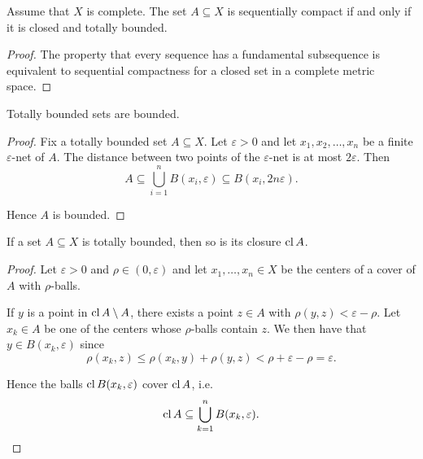 \begin{corollary}\label{thm:metric_space_compact_iff_closed_totally_bounded}
  Assume that \( X \) is complete. The set \( A \subseteq X \) is sequentially compact if and only if it is closed and totally bounded.
\end{corollary}
\begin{proof}
  The property that every sequence has a fundamental subsequence is equivalent to sequential compactness for a closed set in a complete metric space.
\end{proof}

\begin{proposition}\label{thm:totally_bounded_sets_are_bounded}
  Totally bounded sets are bounded.
\end{proposition}
\begin{proof}
  Fix a totally bounded set \( A \subseteq X \). Let \( \varepsilon > 0 \) and let \( x_1, x_2, \ldots, x_n \) be a finite \( \varepsilon \)-net of \( A \). The distance between two points of the \( \varepsilon \)-net is at most \( 2\varepsilon \). Then
  \begin{equation*}
    A \subseteq \bigcup_{i=1}^n B(x_i, \varepsilon) \subseteq B(x_i, 2 n \varepsilon).
  \end{equation*}

  Hence \( A \) is bounded.
\end{proof}

\begin{proposition}\label{thm:closure_of_totally_bounded_is_totally_bounded}
  If a set \( A \subseteq X \) is totally bounded, then so is its closure \( \operatorname{cl} A \).
\end{proposition}
\begin{proof}
  Let \( \varepsilon > 0 \) and \( \rho \in (0, \varepsilon) \) and let \( x_1, \ldots, x_n \in X \) be the centers of a cover of \( A \) with \( \rho \)-balls.

  If \( y \) is a point in \( \operatorname{cl} A \setminus A \), there exists a point \( z \in A \) with \( \rho(y, z) < \varepsilon - \rho \). Let \( x_k \in A \) be one of the centers whose \( \rho \)-balls contain \( z \). We then have that \( y \in B(x_k, \varepsilon) \) since
  \begin{equation*}
    \rho(x_k, z) \leq \rho(x_k, y) + \rho(y, z) < \rho + \varepsilon - \rho = \varepsilon.
  \end{equation*}

  Hence the balls \( \operatorname{cl} B(x_k, \varepsilon) \) cover \( \operatorname{cl} A \), i.e.
  \begin{equation*}
    \operatorname{cl} A \subseteq \bigcup_{k=1}^n B(x_k, \varepsilon).
  \end{equation*}
\end{proof}

